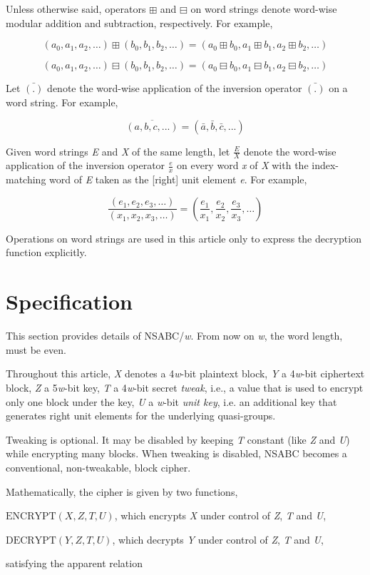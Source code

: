 \documentclass[a4paper,oneside,english]{amsart}
\numberwithin{equation}{section}
\numberwithin{figure}{section}
\newenvironment{lyxlist}[1]
{\begin{list}{}
{\settowidth{\labelwidth}{#1}
 \setlength{\leftmargin}{\labelwidth}
 \addtolength{\leftmargin}{\labelsep}
 \renewcommand{\makelabel}[1]{##1\hfil}}}
{\end{list}}
\begin{document}
Unless otherwise said, operators $\boxplus$ and $\boxminus$ on word
strings denote word-wise modular addition and subtraction, respectively.
For example, 

\[
(a_{0},a_{1},a_{2},\ldots)\boxplus(b_{0},b_{1},b_{2},\ldots)=(a_{0}\boxplus b_{0},a_{1}\boxplus b_{1},a_{2}\boxplus b_{2},\ldots)
\]


\[
(a_{0},a_{1},a_{2},\ldots)\boxminus(b_{0},b_{1},b_{2},\ldots)=(a_{0}\boxminus b_{0},a_{1}\boxminus b_{1},a_{2}\boxminus b_{2},\ldots)
\]


Let $\bar{(.)}$ denote the word-wise application of the inversion
operator $\bar{(.)}$ on a word string. For example, 

\[
\overline{(a,b,c,...)}=(\bar{a},\bar{b},\bar{c},...)
\]


Given word strings \emph{E} and \emph{X} of the same length, let $\frac{E}{X}$
denote the word-wise application of the inversion operator $\frac{e}{x}$
on every word \emph{x} of \emph{X} with the index-matching word of
\emph{E} taken as the {[}right{]} unit element \emph{e}. For example,

\[
\frac{(e_{1},e_{2},e_{3},\ldots)}{(x_{1},x_{2},x_{3},\ldots)}=\left(\frac{e_{1}}{x_{1}},\frac{e_{2}}{x_{2}},\frac{e{}_{3}}{x_{3}},\ldots\right)
\]


Operations on word strings are used in this article only to express
the decryption function explicitly.


\section{Specification}

This section provides details of NSABC/\emph{w}. From now on \emph{w},
the word length, must be even.

Throughout this article, \emph{X} denotes a 4\emph{w}-bit plaintext
block, \emph{Y} a 4\emph{w}-bit ciphertext block, \emph{Z} a 5\emph{w}-bit
key, \emph{T} a 4\emph{w}-bit secret \emph{tweak}, i.e., a value that
is used to encrypt only one block under the key, \emph{U} a \emph{w}-bit
\emph{unit key}, i.e. an additional key that generates right unit
elements for the underlying quasi-groups.

Tweaking is optional. It may be disabled by keeping \emph{T} constant
(like \emph{Z} and \emph{U}) while encrypting many blocks. When tweaking
is disabled, NSABC becomes a conventional, non-tweakable, block cipher.

Mathematically, the cipher is given by two functions,
\begin{lyxlist}{00.00.0000}
\item [{$\textrm{ENCRYPT}(X,Z,T,U)$,}] which encrypts \emph{X} under control
of \emph{Z}, \emph{T} and \emph{U},
\item [{$\textrm{DECRYPT}(Y,Z,T,U)$,}] which decrypts \emph{Y} under control
of \emph{Z}, \emph{T} and \emph{U},
\end{lyxlist}
satisfying the apparent relation
\end{document}
